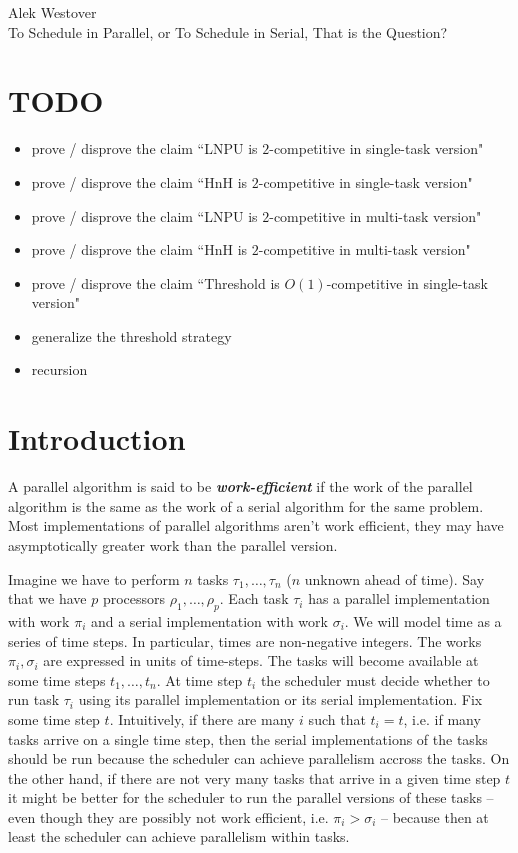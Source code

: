 \documentclass{article}[11pt]
\newcommand{\defn}[1]{{\textit{\textbf{\boldmath #1}}}\xspace}
\begin{document}
\begin{center}
\begin{Large}
	Alek Westover \\
	\vspace{2mm}
  To Schedule in Parallel, or To Schedule in Serial, That is the
  Question?
\end{Large}
\end{center}
\thispagestyle{empty}

\section{TODO}

\begin{itemize}
  \item prove / disprove the claim ``LNPU is $2$-competitive in
    single-task version"
  \item prove / disprove the claim ``HnH is $2$-competitive in
    single-task version"
  \item prove / disprove the claim ``LNPU is $2$-competitive in
    multi-task version"
  \item prove / disprove the claim ``HnH is $2$-competitive in
    multi-task version"
  \item prove / disprove the claim ``Threshold is $O(1)$-competitive in
    single-task version"
  \item generalize the threshold strategy
  \item recursion
\end{itemize}

\section{Introduction}
A parallel algorithm is said to be \defn{work-efficient} if the
work of the parallel algorithm is the same as the work of a
serial algorithm for the same problem.
Most implementations of parallel algorithms aren't work
efficient, they may have asymptotically greater work than the
parallel version.

Imagine we have to perform $n$ tasks $\tau_1, \ldots, \tau_n$
($n$ unknown ahead of time). 
Say that we have $p$ processors $\rho_1, \ldots, \rho_p$.
Each task $\tau_i$ has a parallel implementation with work
$\pi_i$ and a serial implementation with work $\sigma_i$.
We will model time as a series of time steps. In particular,
times are non-negative integers.
The works $\pi_i, \sigma_i$ are expressed in units of time-steps.
The tasks will become available at some time steps $t_1, 
\ldots, t_n$. At time step $t_i$ the scheduler must decide
whether to run task $\tau_i$ using its parallel implementation or
its serial implementation. Fix some time step $t$. Intuitively,
if there are many $i$ such that $t_i = t$, i.e. if many tasks
arrive on a single time step, then the serial implementations of
the tasks should be run because the scheduler can achieve
parallelism accross the tasks. On the other hand, if there are
not very many tasks that arrive in a given time step $t$ it might
be better for the scheduler to run the parallel versions of these
tasks -- even though they are possibly not work efficient, i.e.
$\pi_i > \sigma_i$ -- because then at least the scheduler can
achieve parallelism within tasks.
\end{document}
